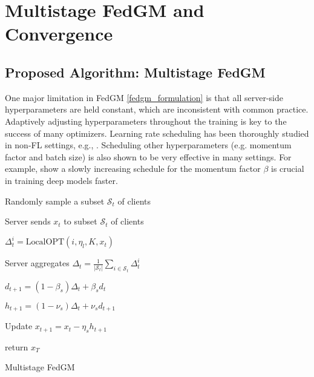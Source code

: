 \section{Multistage FedGM and Convergence}
\label{sec:stagewise}

\subsection{Proposed Algorithm: Multistage FedGM}

One major limitation in FedGM \eqref{fedgm_formulation} is that all server-side hyperparameters are held constant, which are inconsistent with common practice. Adaptively adjusting hyperparameters throughout the training is key to the success of many optimizers. Learning rate scheduling has been thoroughly studied in non-FL settings, e.g., \citep{Krizhevsky12ImageNet, He16Res, GoyalDGNWKTJH17LargeMinibatch, Smith17Cyclic}. Scheduling other hyperparameters (e.g. momentum factor and batch size) is also shown to be very effective in many settings. For example, \cite{Sutskever13Init,Smith18Bayesian,Smith18DontDecay} show a slowly increasing schedule for the momentum factor $\beta$ is crucial in training deep models faster.


\begin{algorithm2e}[tb]
\SetAlgoVlined
{}
\SetAlgoLined
{}
{
{
    {   
        Randomly sample a subset $\mathcal{S}_t$ of clients
    
        Server sends $x_t$ to subset $\mathcal{S}_t$ of clients
    
        {
        $\Delta_t^i=\text{LocalOPT}\left(i,\eta_l,K,x_t\right)$
        }
    
        Server aggregates $\Delta_t=\frac{1}{\lvert \mathcal{S}_t\rvert}\sum_{i\in \mathcal{S}_t}\Delta_t^i$
        
        \colorbox{babyblueeyes}{$d_{t+1}=(1-\beta_s)\Delta_{t}+\beta_s d_{t}$}

        \colorbox{babyblueeyes}{$h_{t+1}=(1-\nu_s)\Delta_{t}+\nu_s d_{t+1}$}
        
        \colorbox{babyblueeyes}{Update $x_{t+1}=x_t-\eta_s h_{t+1}$}
        
    }
}
}
return $x_T$
\caption{\colorbox{babyblueeyes}{Multistage FedGM}}
\label{multistage_FedGM_algorithm}
\end{algorithm2e}

